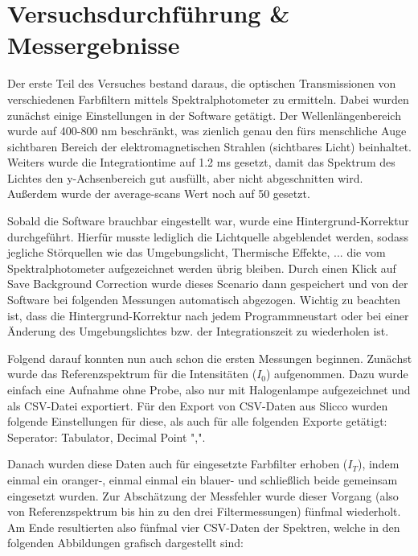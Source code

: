 \documentclass[12pt,a4paper,twoside]{article}
\begin{document}
\section{Versuchsdurchführung \& Messergebnisse} %

Der erste Teil des Versuches bestand daraus, die optischen Transmissionen von verschiedenen Farbfiltern mittels Spektralphotometer zu ermitteln.
Dabei wurden zunächst einige Einstellungen in der Software getätigt. Der Wellenlängenbereich wurde auf 400-800 nm beschränkt, was zienlich genau den fürs menschliche Auge sichtbaren Bereich der elektromagnetischen Strahlen (sichtbares Licht) beinhaltet.
Weiters wurde die Integrationtime auf 1.2 ms gesetzt, damit das Spektrum des Lichtes den y-Achsenbereich gut ausfüllt, aber nicht abgeschnitten wird.
Außerdem wurde der average-scans Wert noch auf 50 gesetzt. \newline

\noindent
Sobald die Software brauchbar eingestellt war, wurde eine Hintergrund-Korrektur durchgeführt. Hierfür musste lediglich die Lichtquelle abgeblendet werden, sodass jegliche Störquellen wie das Umgebungslicht, Thermische Effekte, ... die vom Spektralphotometer aufgezeichnet werden übrig bleiben. Durch einen Klick auf Save Background Correction wurde dieses Scenario dann gespeichert und von der Software bei folgenden Messungen automatisch abgezogen.
Wichtig zu beachten ist, dass die Hintergrund-Korrektur nach jedem Programmneustart oder bei einer Änderung des Umgebungslichtes bzw. der Integrationszeit zu wiederholen ist. \newline

\noindent
Folgend darauf konnten nun auch schon die ersten Messungen beginnen. Zunächst wurde das Referenzspektrum für die Intensitäten ($I_{0}$) aufgenommen. Dazu wurde einfach eine Aufnahme ohne Probe, also nur mit Halogenlampe aufgezeichnet und als CSV-Datei exportiert.
Für den Export von CSV-Daten aus Slicco wurden folgende Einstellungen für diese, als auch für alle folgenden Exporte getätigt: Seperator: Tabulator, Decimal Point ",". \newline

\noindent
Danach wurden diese Daten auch für eingesetzte Farbfilter erhoben ($I_{T}$), indem einmal ein oranger-, einmal einmal ein blauer- und schließlich beide gemeinsam eingesetzt wurden. Zur Abschätzung der Messfehler wurde dieser Vorgang (also von Referenzspektrum bis hin zu den drei Filtermessungen) fünfmal wiederholt.
Am Ende resultierten also fünfmal vier CSV-Daten der Spektren, welche in den folgenden Abbildungen grafisch dargestellt sind:
\end{document}
